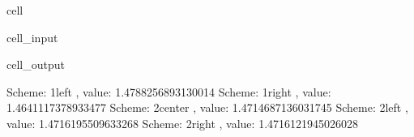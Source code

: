 \documentclass[letterpaper,10pt,italian]{jupyterBook}
\begin{document}
\begin{sphinxuseclass}{cell}\begin{sphinxVerbatimInput}

\begin{sphinxuseclass}{cell_input}
\begin{sphinxVerbatim}[commandchars=\\\{\}]
   

       

    

    
     
\end{sphinxVerbatim}

\end{sphinxuseclass}\end{sphinxVerbatimInput}
\begin{sphinxVerbatimOutput}

\begin{sphinxuseclass}{cell_output}
\begin{sphinxVerbatim}[commandchars=\\\{\}]
Scheme: 1\PYGZus{}left    , value: \PYGZhy{}1.4788256893130014
Scheme: 1\PYGZus{}right   , value: \PYGZhy{}1.4641117378933477
Scheme: 2\PYGZus{}center  , value: \PYGZhy{}1.4714687136031745
Scheme: 2\PYGZus{}left    , value: \PYGZhy{}1.4716195509633268
Scheme: 2\PYGZus{}right   , value: \PYGZhy{}1.4716121945026028
\end{sphinxVerbatim}

\end{sphinxuseclass}\end{sphinxVerbatimOutput}

\end{sphinxuseclass}
\sphinxstepscope
\end{document}
